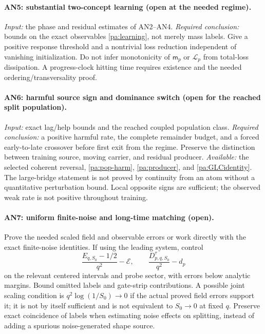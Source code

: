 \documentclass[11pt]{article}
\numberwithin{equation}{section}
\theoremstyle{definition}
\theoremstyle{remark}
\newcommand{\1}{\mathbf 1}
\begin{document}
\paragraph{AN5: substantial two-concept learning (open at the needed regime).}
\emph{Input:} the phase and residual estimates of AN2--AN4.
\emph{Required conclusion:} bounds on the exact observables
\eqref{pa:learning}, not merely mass labels. Give a positive response threshold
and a nontrivial loss reduction independent of vanishing initialization.
Do not infer monotonicity of $\mathsf m_p$ or $\mathcal L_p$ from total-loss
dissipation. A progress-clock hitting time requires existence and the
needed ordering/transversality proof.

\paragraph{AN6: harmful source sign and dominance switch (open for the
reached split population).}
\emph{Input:} exact lag/help bounds and the reached coupled population class.
\emph{Required conclusion:} a positive harmful rate, the complete remainder
budget, and a forced early-to-late crossover before first exit from the
regime. Preserve the distinction between training source, moving carrier,
and residual producer. \emph{Available:} the selected coherent reversal,
\eqref{pa:pop-harm}, \eqref{pa:producer}, and \eqref{pa:GLCidentity}.
The large-bridge statement is not proved by continuity from an atom without
a quantitative perturbation bound. Local opposite signs are sufficient;
the observed weak rate is not positive throughout training.

\paragraph{AN7: uniform finite-noise and long-time matching (open).}
Prove the needed scaled field and observable errors or work directly with
the exact finite-noise identities. If using the leading system, control
\[
 \frac{E_{q,S_0}-1/2}{q^2}-\mathcal E,
 \qquad \frac{D_{p,q,S_0}^\tau}{q^2}-d_p
\]
on the relevant centered intervals and probe sector, with errors below
analytic margins. Bound omitted labels and gate-strip contributions.
A possible joint scaling condition is $q^2\log(1/S_0)\to0$ if the actual
proved field errors support it; it is not by itself sufficient and is not
equivalent to $S_0\to0$ at fixed $q$. Preserve exact coincidence of labels
when estimating noise effects on splitting, instead of adding a spurious
noise-generated shape source.
\end{document}
